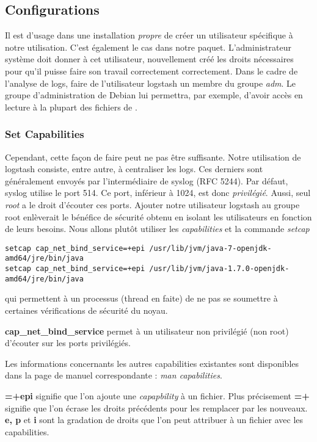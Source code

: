 \subsection{Configurations}
Il est d'usage dans une installation \textit{propre} de créer un utilisateur spécifique
à notre utilisation. C'est également le cas dans notre paquet. L'administrateur 
système doit donner à cet utilisateur, nouvellement créé les droits nécessaires 
pour qu'il puisse faire son travail correctement correctement. Dans le cadre de 
l'analyse de logs, faire de l'utilisateur logstash un membre du groupe \emph{adm}. 
Le groupe d'administration de Debian lui permettra, par exemple, d'avoir accès en 
lecture à la plupart des fichiers de .

\subsubsection{Set Capabilities}
Cependant, cette façon de faire peut ne pas être suffisante.
Notre utilisation de logstash consiste, entre autre, à centraliser les \gls{logs}. 
Ces derniers sont généralement envoyés par l'intermédiaire de syslog (RFC 5244).
Par défaut, syslog utilise le port 514. Ce port, inférieur à 1024, est donc \textit{privilégié}.
Aussi, seul \emph{root} a le droit d'écouter ces ports. Ajouter notre utilisateur 
logstash au groupe root enlèverait le bénéfice de sécurité obtenu en isolant les 
utilisateurs en fonction de leurs besoins. Nous allons plutôt utiliser les 
\emph{capabilities} 
et la commande \emph{setcap}
\begin{lstlisting}[style=code,label={lst:setcapabilities}]
setcap cap_net_bind_service=+epi /usr/lib/jvm/java-7-openjdk-amd64/jre/bin/java
setcap cap_net_bind_service=+epi /usr/lib/jvm/java-1.7.0-openjdk-amd64/jre/bin/java
\end{lstlisting}
qui permettent à un processus (thread en faite) de ne pas se soumettre à certaines 
vérifications de sécurité du noyau.

\textbf{cap\_net\_bind\_service} permet à un utilisateur non privilégié (non root) 
d'écouter sur les ports privilégiés.

Les informations concernants les autres capabilities existantes sont disponibles dans
la page de manuel correspondante : \emph{man capabilities}.

\textbf{=+epi} signifie que l'on ajoute une \emph{capapbility} à un fichier. Plus 
précisement \textbf{=+} signifie que l'on écrase les droits précédents pour les remplacer
par les nouveaux. \textbf{e, p} et \textbf{i} sont la gradation de droits que l'on peut 
attribuer à un fichier avec les capabilities. 

